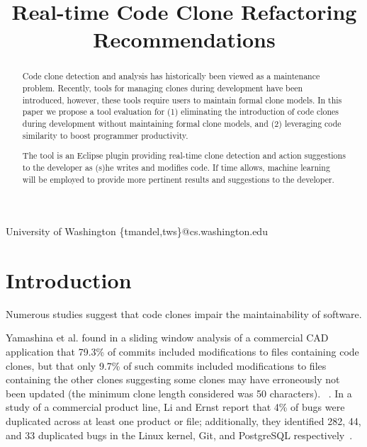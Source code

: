 \documentclass[nocopyrightspace,10pt]{sigplanconf}
\begin{document}
%

\title{Real-time Code Clone Refactoring Recommendations}
           {University of Washington}
           {\{tmandel,tws\}@cs.washington.edu}

\maketitle
\begin{abstract}
Code clone detection and analysis has historically been viewed as a
maintenance problem. Recently, tools for managing clones during
development have been introduced, however, these tools require
users to maintain formal clone models.
In this paper we propose a tool evaluation for (1) eliminating the
introduction of code clones during development without maintaining formal clone models, and (2) leveraging code
similarity to boost programmer productivity.

The tool
is an Eclipse plugin providing real-time clone detection and action
suggestions to the developer as (s)he writes and modifies
code. If time allows, machine learning will be 
employed to provide more pertinent results
and suggestions to the developer.
\end{abstract}



\section{Introduction}
\label{sec:intro}
Numerous studies suggest that code clones impair the maintainability
of software.

Yamashina et al. found in a sliding window analysis of a commercial CAD
application that 79.3\% of commits included modifications to files
containing code clones, but that only 9.7\% of such commits included
modifications to files containing the other
clones suggesting some clones may have erroneously not been updated
(the minimum clone length considered was 50 characters).
~\cite{Yamashina2008}. 
In a study of a commercial product line, Li and Ernst report that 4\%
of bugs were duplicated across at least one product or file;
additionally, they identified 282, 44, and 33 duplicated bugs in the
Linux kernel, Git, and PostgreSQL respectively~\cite{LiE2011}.
\end{document}
